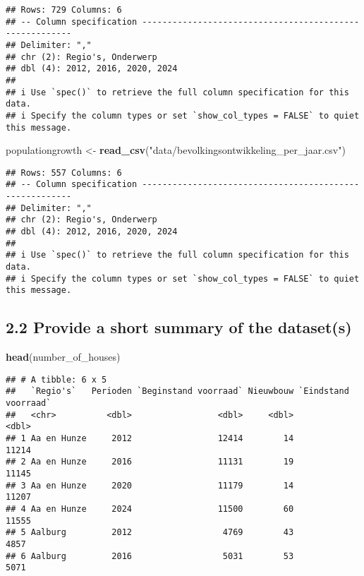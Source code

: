 \documentclass[
]{article}
\newenvironment{Shaded}{\begin{snugshade}}{\end{snugshade}}
\newcommand{\FunctionTok}[1]{\textcolor[rgb]{0.13,0.29,0.53}{\textbf{#1}}}
\newcommand{\NormalTok}[1]{#1}
\newcommand{\OtherTok}[1]{\textcolor[rgb]{0.56,0.35,0.01}{#1}}
\newcommand{\StringTok}[1]{\textcolor[rgb]{0.31,0.60,0.02}{#1}}
\begin{document}
\begin{verbatim}
## Rows: 729 Columns: 6
## -- Column specification --------------------------------------------------------
## Delimiter: ","
## chr (2): Regio's, Onderwerp
## dbl (4): 2012, 2016, 2020, 2024
## 
## i Use `spec()` to retrieve the full column specification for this data.
## i Specify the column types or set `show_col_types = FALSE` to quiet this message.
\end{verbatim}

\begin{Shaded}
\begin{Highlighting}[]
\NormalTok{populationgrowth }\OtherTok{\textless{}{-}} \FunctionTok{read\_csv}\NormalTok{(}\StringTok{"data/bevolkingsontwikkeling\_per\_jaar.csv"}\NormalTok{)}
\end{Highlighting}
\end{Shaded}

\begin{verbatim}
## Rows: 557 Columns: 6
## -- Column specification --------------------------------------------------------
## Delimiter: ","
## chr (2): Regio's, Onderwerp
## dbl (4): 2012, 2016, 2020, 2024
## 
## i Use `spec()` to retrieve the full column specification for this data.
## i Specify the column types or set `show_col_types = FALSE` to quiet this message.
\end{verbatim}

\subsection{2.2 Provide a short summary of the
dataset(s)}\label{provide-a-short-summary-of-the-datasets}

\begin{Shaded}
\begin{Highlighting}[]
\FunctionTok{head}\NormalTok{(number\_of\_houses)}
\end{Highlighting}
\end{Shaded}

\begin{verbatim}
## # A tibble: 6 x 5
##   `Regio's`   Perioden `Beginstand voorraad` Nieuwbouw `Eindstand voorraad`
##   <chr>          <dbl>                 <dbl>     <dbl>                <dbl>
## 1 Aa en Hunze     2012                 12414        14                11214
## 2 Aa en Hunze     2016                 11131        19                11145
## 3 Aa en Hunze     2020                 11179        14                11207
## 4 Aa en Hunze     2024                 11500        60                11555
## 5 Aalburg         2012                  4769        43                 4857
## 6 Aalburg         2016                  5031        53                 5071
\end{verbatim}
\end{document}
